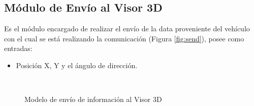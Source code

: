 \subsection{Módulo de Envío al Visor 3D}
Es el módulo encargado de realizar el envío de la data proveniente del vehículo con el cual se está realizando la comunicación (Figura \ref{fig:send}), posee como entradas:

\begin{itemize}
\item Posición X, Y y el ángulo de dirección.
\end{itemize}
\begin{figure}[!h]
 \centering
  \\
 \caption{Modelo de envío de información al Visor 3D}
 \label{fig:rec}
\end{figure}

